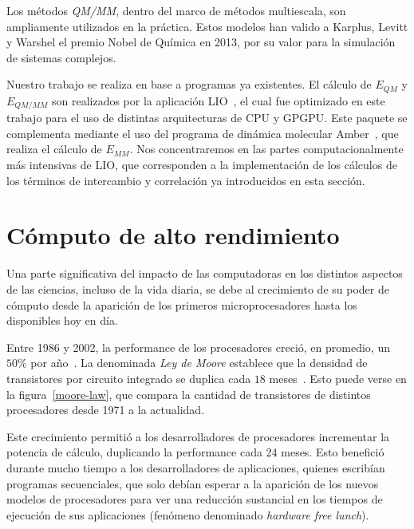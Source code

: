 Los m\'etodos \textit{QM/MM}, dentro del marco de m\'etodos multiescala, son ampliamente utilizados en la pr\'actica.
Estos modelos han valido a Karplus, Levitt y Warshel el premio Nobel de Qu\'imica en 2013, por su valor para la simulaci\'on de sistemas complejos.

Nuestro trabajo se realiza en base a programas ya existentes.
El c\'alculo de $E_{QM}$ y $E_{QM/MM}$ son realizados por la aplicaci\'on LIO~\cite{Nitsche2014,TesisNitsche}, el cual fue optimizado en este trabajo para el uso de distintas arquitecturas de CPU y GPGPU.
Este paquete se complementa mediante el uso del programa de din\'amica molecular Amber~\cite{Amber}, que realiza el c\'alculo de $E_{MM}$.
Nos concentraremos en las partes computacionalmente m\'as intensivas de LIO, que corresponden a la implementaci\'on de los c\'alculos de los t\'erminos de intercambio y correlaci\'on ya introducidos en esta secci\'on.

\section{C\'omputo de alto rendimiento}

Una parte significativa del impacto de las computadoras en los distintos aspectos de las ciencias, incluso de la vida diaria, se debe al crecimiento de su poder de c\'omputo desde la aparici\'on de los primeros microprocesadores hasta los disponibles hoy en d\'ia.

Entre 1986 y 2002, la performance de los procesadores creci\'o, en promedio, un $50\%$ por a\~no~\cite{Pacheco2011}.
La denominada \textit{Ley de Moore} establece que la densidad de transistores por circuito integrado se duplica cada $18$ meses~\cite{HennessyPatterson}.
Esto puede verse en la figura~\ref{moore-law}, que compara la cantidad de transistores de distintos procesadores desde 1971 a la actualidad.

Este crecimiento permiti\'o a los desarrolladores de procesadores incrementar la potencia de c\'alculo, duplicando la performance cada 24 meses.
Esto benefici\'o durante mucho tiempo a los desarrolladores de aplicaciones, quienes escrib\'ian programas secuenciales, que solo deb\'ian esperar a la aparici\'on de los nuevos modelos de procesadores para ver una reducci\'on sustancial en los tiempos de ejecuci\'on de sus aplicaciones (fen\'omeno denominado \textit{hardware free lunch}).

